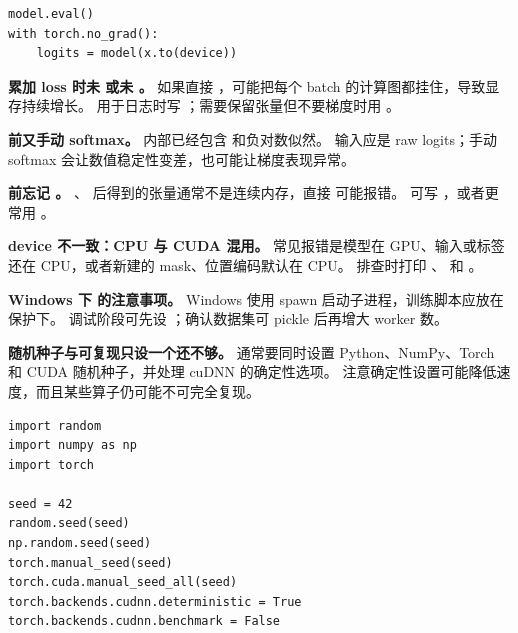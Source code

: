 \begin{lstlisting}
model.eval()
with torch.no_grad():
    logits = model(x.to(device))
\end{lstlisting}

\begin{trap}
\textbf{累加 loss 时未  或未 。}
如果直接 ，可能把每个 batch 的计算图都挂住，导致显存持续增长。
用于日志时写 ；需要保留张量但不要梯度时用 。
\end{trap}

\begin{trap}
\textbf{ 前又手动 softmax。}
 内部已经包含  和负对数似然。
输入应是 raw logits；手动 softmax 会让数值稳定性变差，也可能让梯度表现异常。
\end{trap}

\begin{trap}
\textbf{ 前忘记 。}
、 后得到的张量通常不是连续内存，直接  可能报错。
可写 ，或者更常用 。
\end{trap}

\begin{trap}
\textbf{device 不一致：CPU 与 CUDA 混用。}
常见报错是模型在 GPU、输入或标签还在 CPU，或者新建的 mask、位置编码默认在 CPU。
排查时打印 、 和 。
\end{trap}

\begin{trap}
\textbf{Windows 下  的注意事项。}
Windows 使用 spawn 启动子进程，训练脚本应放在  保护下。
调试阶段可先设 ；确认数据集可 pickle 后再增大 worker 数。
\end{trap}

\begin{trap}
\textbf{随机种子与可复现只设一个还不够。}
通常要同时设置 Python、NumPy、Torch 和 CUDA 随机种子，并处理 cuDNN 的确定性选项。
注意确定性设置可能降低速度，而且某些算子仍可能不可完全复现。
\end{trap}

\begin{lstlisting}
import random
import numpy as np
import torch

seed = 42
random.seed(seed)
np.random.seed(seed)
torch.manual_seed(seed)
torch.cuda.manual_seed_all(seed)
torch.backends.cudnn.deterministic = True
torch.backends.cudnn.benchmark = False
\end{lstlisting}

